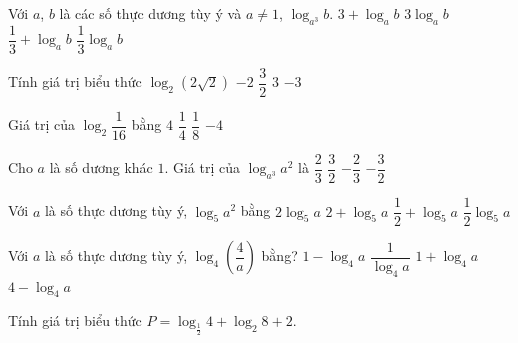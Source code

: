 \begin{ex}%
	Với $a$, $b$ là các số thực dương tùy ý  và $a\ne 1$, $\log_{a^3}b$.
	 \choice
		{$3+\log_ab$} 
		 {$3\log_ab$}
		{$\dfrac{1}{3}+\log_ab$} 
		{\True  $\dfrac{1}{3}\log_ab$}
\end{ex}

\begin{ex}%
	 Tính giá trị biểu thức $\log_2\left(2\sqrt{2}\right)$
	\choice 
		{$-2$} 
		 {\True $\dfrac{3}{2}$}
		{$3$} 
		 {$-3$}
\end{ex}

\begin{ex}%
	Giá trị của  $\log_{2}\dfrac{1}{16}$ bằng
	 \choice
		{$4$} 
		 {$\dfrac{1}{4}$}
		 {$\dfrac{1}{8}$}
		{\True  $-4$}
\end{ex}

\begin{ex}%
	Cho  $ a $ là số dương khác $ 1 $. Giá trị của $\log_{a^3} a^2$ là
	 \choice
		{\True $\dfrac{2}{3}$} 
		 {$\dfrac{3}{2}$}
		 {$-\dfrac{2}{3}$}
		{$-\dfrac{3}{2}$} 
\end{ex}

\begin{ex}%
	 Với $a$ là số thực dương tùy ý, $\log_5 a^2$ bằng
	 \choice
		 {\True $2\log_5 a$}
		{$2+\log_5 a$} 
		 {$\dfrac{1}{2}+\log_5 a$}
		 {$\dfrac{1}{2} \log_5 a$}
\end{ex}

\begin{ex}%
	Với $a$ là số thực dương tùy ý, $\log_4\left(\dfrac{4}{a}\right)$  bằng?
	\choice 
		{\True  $1-\log_4a$}
		{$\dfrac{1}{\log_4a}$} 
		 {$1+\log_4a$}
		{$4-\log_4a$} 
\end{ex}

\begin{ex}%
	 Tính giá trị biểu thức $P=\log_{\tfrac{1}{2}} 4+\log_2 8+2$.
\end{ex}

